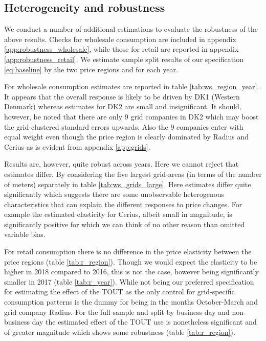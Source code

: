 \subsection{Heterogeneity and robustness}
\label{subsec:r_robustness}
\begin{comment}
Heterogeneous effects
\begin{figure}[H]
  \centering
  \caption{Wholesale elasticity by hour}
  \label{fig:ws_elasticity_hour}
\end{figure}

\begin{figure}[H]
  \centering
  \caption{Wholesale peak-elasticity by log grid size}
  \label{fig:ws_elasticity_grid}
\end{figure}
\end{comment}
We conduct a number of additional estimations to evaluate the robustness of the above results. Checks for wholesale consumption are included in appendix \ref{app:robustness_wholesale}, while those for retail are reported in appendix \ref{app:robustness_retail}. We estimate sample split results of our specification \eqref{eq:baseline} by the two price regions and for each year.
\bigskip\par
For wholesale consumption estimates are reported in table \ref{tab:ws_region_year}. It appears that the overall response is likely to be driven by DK1 (Western Denmark) whereas estimates for DK2 are small and insignificant. It should, however, be noted that there are only 9 grid companies in DK2 which may boost the grid-clustered standard errors upwards. Also the 9 companies enter with equal weight even though the price region is clearly dominated by Radius and Cerius as is evident from appendix \ref{app:grids}.
\par
Results are, however, quite robust across years. Here we cannot reject that estimates differ. By considering the five largest grid-areas (in terms of the number of meters) separately in table \ref{tab:ws_grids_large}. Here estimates differ quite significantly which suggests there are some unobservable heterogenous characteristics that can explain the different responses to price changes. For example the estimated elasticity for Cerius, albeit small in magnitude, is significantly positive for which we can think of no other reason than omitted variable bias.
\par
For retail consumption there is no difference in the price elasticity between the price regions (table \ref{tab:r_region}). Though we would expect the elasticity to be higher in 2018 compared to 2016, this is not the case, however being significantly smaller in 2017 (table \ref{tab:r_year}). While not being our preferred specification for estimating the effect of the TOUT as the only control for grid-specific consumption patterns is the dummy for being in the months October-March and grid company Radius. For the full sample and split by business day and non-business day the estimated effect of the TOUT use is nonetheless significant and of greater magnitude which shows some robustness (table \ref{tab:r_region}).
